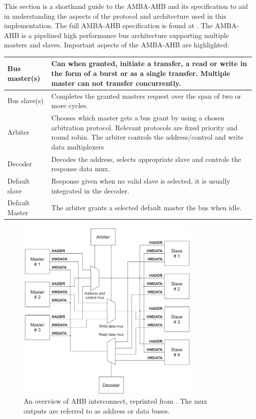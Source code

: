 This section is a shorthand guide to the AMBA-AHB and its specification to aid in understanding the aspects of the protocol and architecture used in this implementation. The full AMBA-AHB specification is found at \cite{amba}. The AMBA-AHB is a pipelined high performance bus architecture supporting multiple masters and slaves. Important aspects of the AMBA-AHB are highlighted:

\begin{tabular}{p{3cm} p{10cm}}
Bus master(s) & Can when granted, initiate a transfer, a read or write in the form of a burst or as a single transfer. Multiple master can not transfer concurrently. \\
\hline
Bus slave(s) & Completes the granted masters request over the span of two or more cycles. \\
\hline
Arbiter & Chooses which master gets a bus grant by using a chosen arbitration protocol. Relevant protocols are fixed priority and round robin. The arbiter controls the address/control and write data multiplexers \\
\hline
Decoder & Decodes the address, selects appropriate slave and controls the response data mux. \\
\hline
Default slave & Response given when no valid slave is selected, it is usually integrated in the decoder.\\
\hline
Default Master & The arbiter grants a selected default master the bus when idle. \\
\end{tabular}

\newpage

\begin{figure}[hbt]
    \begin{center}
        \includegraphics[width=0.8\textwidth]{figs/AHB/AHB_connections.png}
    \end{center}
    \caption{An overview of AHB interconnect, reprinted from \cite{amba}. The mux outputs are referred to as address or data buses.}
    \label{fig:interc}
\end{figure}

